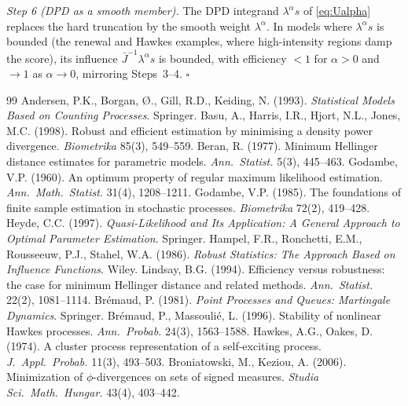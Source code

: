 \documentclass[smallextended,natbib]{svjour3}
\begin{document}
\emph{Step 6 (DPD as a smooth member).} The DPD integrand $\lambda^\alpha s$ of
\eqref{eq:Ualpha} replaces the hard truncation by the smooth weight $\lambda^\alpha$.
In models where $\lambda^\alpha s$ is bounded (the renewal and Hawkes examples,
where high-intensity regions damp the score), its influence
$\bar J^{-1}\lambda^\alpha s$ is bounded, with efficiency $<1$ for $\alpha>0$ and
$\to1$ as $\alpha\to0$, mirroring Steps~3--4. \hfill$\square$

\begin{thebibliography}{99}
 Andersen, P.K., Borgan, \O., Gill, R.D., Keiding, N. (1993). \textit{Statistical Models Based on Counting Processes}. Springer.
 Basu, A., Harris, I.R., Hjort, N.L., Jones, M.C. (1998). Robust and efficient estimation by minimising a density power divergence. \textit{Biometrika} 85(3), 549--559.
 Beran, R. (1977). Minimum Hellinger distance estimates for parametric models. \textit{Ann.\ Statist.} 5(3), 445--463.
 Godambe, V.P. (1960). An optimum property of regular maximum likelihood estimation. \textit{Ann.\ Math.\ Statist.} 31(4), 1208--1211.
 Godambe, V.P. (1985). The foundations of finite sample estimation in stochastic processes. \textit{Biometrika} 72(2), 419--428.
 Heyde, C.C. (1997). \textit{Quasi-Likelihood and Its Application: A General Approach to Optimal Parameter Estimation}. Springer.
 Hampel, F.R., Ronchetti, E.M., Rousseeuw, P.J., Stahel, W.A. (1986). \textit{Robust Statistics: The Approach Based on Influence Functions}. Wiley.
 Lindsay, B.G. (1994). Efficiency versus robustness: the case for minimum Hellinger distance and related methods. \textit{Ann.\ Statist.} 22(2), 1081--1114.
 Br\'emaud, P. (1981). \textit{Point Processes and Queues: Martingale Dynamics}. Springer.
 Br\'emaud, P., Massouli\'e, L. (1996). Stability of nonlinear Hawkes processes. \textit{Ann.\ Probab.} 24(3), 1563--1588.
 Hawkes, A.G., Oakes, D. (1974). A cluster process representation of a self-exciting process. \textit{J.\ Appl.\ Probab.} 11(3), 493--503.
 Broniatowski, M., Keziou, A. (2006). Minimization of $\phi$-divergences on sets of signed measures. \textit{Studia Sci.\ Math.\ Hungar.} 43(4), 403--442.

\end{thebibliography}
\end{document}
